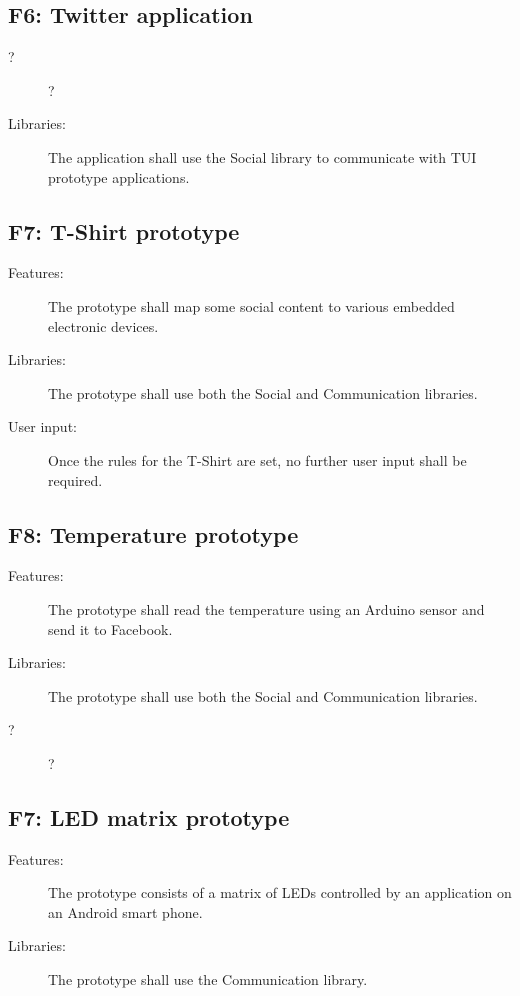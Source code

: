 \subsection{F6: Twitter application}
\begin{description}
	\item[?] ?
	\item[Libraries:] The application shall use the Social library to
	communicate with TUI prototype applications.
\end{description}

\subsection{F7: T-Shirt prototype}
\begin{description}
	\item[Features:] The prototype shall map some social content to various
	embedded electronic devices.
	\item[Libraries:] The prototype shall use both the Social and Communication
	libraries.
	\item[User input:] Once the rules for the T-Shirt are set, no further user
	input shall be required.
\end{description}

\subsection{F8: Temperature prototype}
\begin{description}
	\item[Features:] The prototype shall read the temperature using an Arduino
	sensor and send it to Facebook.
	\item[Libraries:] The prototype shall use both the Social and Communication
	libraries.
	\item[?] ?
\end{description}
	
	\subsection{F7:  LED matrix prototype}
	\begin{description}
		\item[Features:] The prototype consists of a matrix of LEDs controlled by an application on 
		an Android smart phone.
		\item[Libraries:] The prototype shall use the Communication library.
		\item[]
	\end{description}

